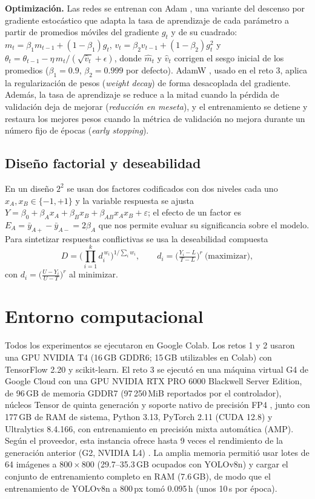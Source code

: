 \documentclass[conference]{IEEEtran}
\begin{document}
\textbf{Optimización.} Las redes se entrenan con Adam \cite{kingma2015}, una variante del descenso por gradiente estocástico que adapta la tasa de aprendizaje de cada parámetro a partir de promedios móviles del gradiente $g_t$ y de su cuadrado: $m_t=\beta_1m_{t-1}+(1-\beta_1)g_t$, $v_t=\beta_2v_{t-1}+(1-\beta_2)g_t^2$ y $\theta_t=\theta_{t-1}-\eta\,\hat m_t/(\sqrt{\hat v_t}+\epsilon)$, donde $\hat m_t$ y $\hat v_t$ corrigen el sesgo inicial de los promedios ($\beta_1=0.9$, $\beta_2=0.999$ por defecto). AdamW \cite{loshchilov2019}, usado en el reto 3, aplica la regularización de pesos (\emph{weight decay}) de forma desacoplada del gradiente. Además, la tasa de aprendizaje se reduce a la mitad cuando la pérdida de validación deja de mejorar (\emph{reducción en meseta}), y el entrenamiento se detiene y restaura los mejores pesos cuando la métrica de validación no mejora durante un número fijo de épocas (\emph{early stopping}).

\subsection{Diseño factorial y deseabilidad}
En un diseño $2^2$ se usan dos factores codificados con dos niveles cada uno $x_A,x_B\in\{-1,+1\}$ y la variable respuesta se ajusta $Y=\beta_0+\beta_Ax_A+\beta_Bx_B+\beta_{AB}x_Ax_B+\varepsilon$; el efecto de un factor es $E_A=\bar y_{A+}-\bar y_{A-}=2\beta_A$ que nos permite evaluar su significancia sobre el modelo. Para sintetizar respuestas conflictivas se usa la deseabilidad compuesta \cite{derringer1980}
\begin{equation}
D=\Big(\prod_{i=1}^{k} d_i^{\,w_i}\Big)^{1/\sum_i w_i},\qquad
d_i=\Big(\tfrac{Y_i-L}{T-L}\Big)^{r}\ \text{(maximizar)},
\end{equation}
con $d_i=\big(\tfrac{U-Y_i}{U-T}\big)^r$ al minimizar.

\section{Entorno computacional}
Todos los experimentos se ejecutaron en Google Colab. Los retos 1 y 2 usaron una GPU NVIDIA T4 (16\,GB GDDR6; 15\,GB utilizables en Colab) con TensorFlow 2.20 y scikit-learn. El reto 3 se ejecutó en una máquina virtual G4 de Google Cloud con una GPU NVIDIA RTX PRO 6000 Blackwell Server Edition, de 96\,GB de memoria GDDR7 (97\,250\,MiB reportados por el controlador), núcleos Tensor de quinta generación y soporte nativo de precisión FP4 \cite{googleg4}, junto con 177\,GB de RAM de sistema, Python 3.13, PyTorch 2.11 (CUDA 12.8) y Ultralytics 8.4.166, con entrenamiento en precisión mixta automática (AMP). Según el proveedor, esta instancia ofrece hasta 9 veces el rendimiento de la generación anterior (G2, NVIDIA L4) \cite{googleg4}. La amplia memoria permitió usar lotes de 64 imágenes a $800\times800$ (29.7--35.3\,GB ocupados con YOLOv8n) y cargar el conjunto de entrenamiento completo en RAM (7.6\,GB), de modo que el entrenamiento de YOLOv8n a 800\,px tomó 0.095\,h (unos 10\,s por época).
\end{document}
